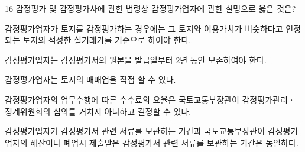 \begin{question}{16}
감정평가 및 감정평가사에 관한 법령상 감정평가업자에 관한 설명으로 옳은 것은?
\begin{choices}
  \item 감정평가업자가 토지를 감정평가하는 경우에는 그 토지와 이용가치가 비슷하다고 인정되는 토지의 적정한 실거래가를 기준으로 하여야 한다.
  \item 감정평가업자는 감정평가서의 원본을 발급일부터 2년 동안 보존하여야 한다.
  \item 감정평가업자는 토지의 매매업을 직접 할 수 있다.
  \item 감정평가업자의 업무수행에 따른 수수료의 요율은 국토교통부장관이 감정평가관리ㆍ징계위원회의 심의를 거치지 아니하고 결정할 수 있다.
  \item 감정평가업자가 감정평가서 관련 서류를 보관하는 기간과 국토교통부장관이 감정평가업자의 해산이나 폐업시 제출받은 감정평가서 관련 서류를 보관하는 기간은 동일하다.
\end{choices}
\end{question}
